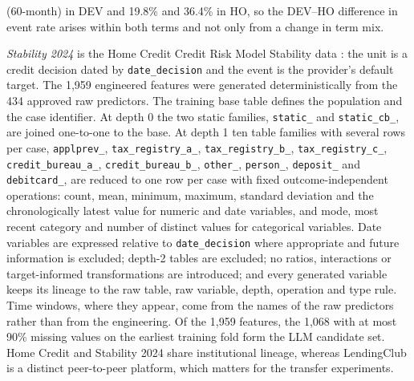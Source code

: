 \documentclass[final,5p,twocolumn]{elsarticle}
\begin{document}
(60-month) in DEV and 19.8\% and 36.4\% in HO, so the DEV--HO difference in event rate arises within both terms and not only from a change in term mix.

\emph{Stability 2024} is the Home Credit Credit Risk Model Stability data \cite{homecredit2024}: the unit is a credit decision dated by \texttt{date\_\allowbreak decision} and the event is the provider's default target. The 1,959 engineered features were generated deterministically from the 434 approved raw predictors. The training base table defines the population and the case identifier. At depth 0 the two static families, \texttt{static\_} and \texttt{static\_\allowbreak cb\_}, are joined one-to-one to the base. At depth 1 ten table families with several rows per case, \texttt{applprev\_}, \texttt{tax\_\allowbreak registry\_\allowbreak a\_}, \texttt{tax\_\allowbreak registry\_\allowbreak b\_}, \texttt{tax\_\allowbreak registry\_\allowbreak c\_}, \texttt{credit\_\allowbreak bureau\_\allowbreak a\_}, \texttt{credit\_\allowbreak bureau\_\allowbreak b\_}, \texttt{other\_}, \texttt{person\_}, \texttt{deposit\_} and \texttt{debitcard\_}, are reduced to one row per case with fixed outcome-independent operations: count, mean, minimum, maximum, standard deviation and the chronologically latest value for numeric and date variables, and mode, most recent category and number of distinct values for categorical variables. Date variables are expressed relative to \texttt{date\_\allowbreak decision} where appropriate and future information is excluded; depth-2 tables are excluded; no ratios, interactions or target-informed transformations are introduced; and every generated variable keeps its lineage to the raw table, raw variable, depth, operation and type rule. Time windows, where they appear, come from the names of the raw predictors rather than from the engineering. Of the 1,959 features, the 1,068 with at most 90\% missing values on the earliest training fold form the LLM candidate set. Home Credit and Stability 2024 share institutional lineage, whereas LendingClub is a distinct peer-to-peer platform, which matters for the transfer experiments.
\end{document}

